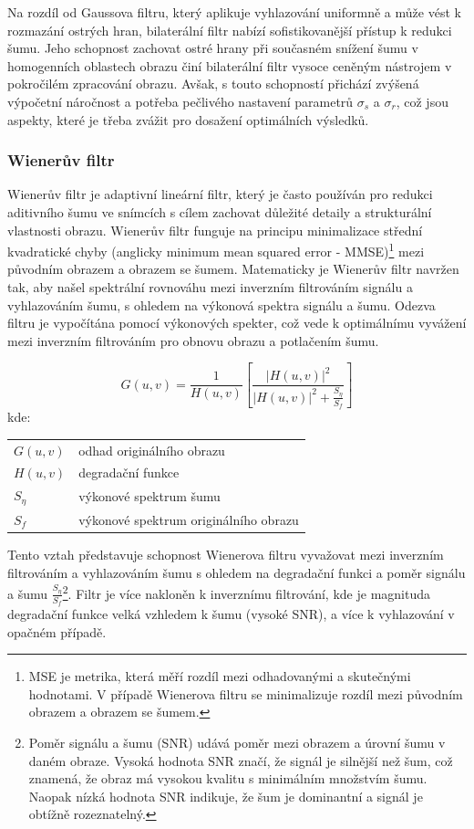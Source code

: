 \documentclass[male,czech,api_ing]{thesis}
\makeatletter
\newenvironment{conditions}[1][kde:]
    {#1 \begin{tabular}[t]{>{$}l<{$} @{${}={}$} >{\raggedright\arraybackslash}p{10cm}}}
    {\end{tabular}}
\makeatother
\begin{document}
Na rozdíl od Gaussova filtru, který aplikuje vyhlazování uniformně a může vést k rozmazání ostrých hran, bilaterální filtr nabízí sofistikovanější přístup k redukci šumu. Jeho schopnost zachovat ostré hrany při současném snížení šumu v homogenních oblastech obrazu činí bilaterální filtr vysoce ceněným nástrojem v pokročilém zpracování obrazu. Avšak, s touto schopností přichází zvýšená výpočetní náročnost a potřeba pečlivého nastavení parametrů $\sigma_s$ a $\sigma_r$, což jsou aspekty, které je třeba zvážit pro dosažení optimálních výsledků. \cite{BilateralFilter}

\subsubsection{Wienerův filtr}
Wienerův filtr je adaptivní lineární filtr, který je často používán pro redukci aditivního šumu ve snímcích s cílem zachovat důležité detaily a strukturální vlastnosti obrazu. Wienerův filtr funguje na principu minimalizace střední kvadratické chyby (anglicky minimum mean squared error - MMSE)\footnote{MSE je metrika, která měří rozdíl mezi odhadovanými a skutečnými hodnotami. V případě Wienerova filtru se minimalizuje rozdíl mezi původním obrazem a obrazem se šumem.} mezi původním obrazem a obrazem se šumem. Matematicky je Wienerův filtr navržen tak, aby našel spektrální rovnováhu mezi inverzním filtrováním signálu a vyhlazováním šumu, s ohledem na výkonová spektra signálu a šumu. Odezva filtru je vypočítána pomocí výkonových spekter, což vede k optimálnímu vyvážení mezi inverzním filtrováním pro obnovu obrazu a potlačením šumu.

\begin{equation}
    G(u,v) = \frac{1}{H(u,v)} \left[ \frac{\left| H(u,v) \right|^2}{\left| H(u,v) \right|^2 + \frac{S_{\eta}}{S_f}} \right]
\end{equation}
\begin{conditions}
    G(u,v) & odhad originálního obrazu \\
    H(u,v) & degradační funkce \\
    S_{\eta} & výkonové spektrum šumu \\
    S_f & výkonové spektrum originálního obrazu
\end{conditions}

Tento vztah představuje schopnost Wienerova filtru vyvažovat mezi inverzním filtrováním a vyhlazováním šumu s ohledem na degradační funkci a poměr signálu a šumu $\frac{S_{\eta}}{S_f}$\footnote{Poměr signálu a šumu (SNR) udává poměr mezi obrazem a úrovní šumu v daném obraze. Vysoká hodnota SNR značí, že signál je silnější než šum, což znamená, že obraz má vysokou kvalitu s minimálním množstvím šumu. Naopak nízká hodnota SNR indikuje, že šum je dominantní a signál je obtížně rozeznatelný.}. Filtr je více nakloněn k inverznímu filtrování, kde je magnituda degradační funkce velká vzhledem k šumu (vysoké SNR), a více k vyhlazování v opačném případě. \cite{WienerFilters}
\end{document}
